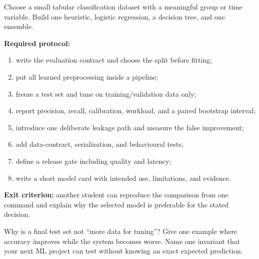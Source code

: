 \begin{practicallab}
Choose a small tabular classification dataset with a meaningful group or time
variable.
Build one heuristic, logistic regression, a decision tree, and one ensemble.

\textbf{Required protocol:}
\begin{enumerate}
    \item write the evaluation contract and choose the split before fitting;
    \item put all learned preprocessing inside a pipeline;
    \item freeze a test set and tune on training/validation data only;
    \item report precision, recall, calibration, workload, and a paired
          bootstrap interval;
    \item introduce one deliberate leakage path and measure the false
          improvement;
    \item add data-contract, serialization, and behavioural tests;
    \item define a release gate including quality and latency;
    \item write a short model card with intended use, limitations, and evidence.
\end{enumerate}

\textbf{Exit criterion:}
another student can reproduce the comparison from one command and explain why
the selected model is preferable for the stated decision.
\end{practicallab}

\begin{checkpoint}
Why is a final test set not ``more data for tuning''?
Give one example where accuracy improves while the system becomes worse.
Name one invariant that your next ML project can test without knowing an exact
expected prediction.
\end{checkpoint}

%
